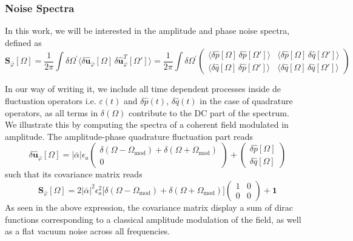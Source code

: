 \subsubsection{Noise Spectra}
In this work, we will be interested in the amplitude and phase noise spectra, defined as
\begin{equation}
  \mathbf{S}_{\bar{\varphi}}[\Omega] =   \frac{1}{2\pi} \int \delta \Omega^{'} \langle \delta \mathbf{\hat{u}}_{\bar{\varphi}}[\Omega]\, \delta \mathbf{\hat{u}}_{\bar{\varphi}}^{T}[\Omega'] \rangle =  \frac{1}{2\pi} \int \delta \Omega^{'} \begin{pmatrix}
  \langle \delta \hat{p}[\Omega]\,\delta \hat{p}[\Omega'] \rangle & \langle \delta \hat{p}[\Omega]\,\delta \hat{q}[\Omega'] \rangle \\[4pt]
  \langle \delta \hat{q}[\Omega]\,\delta \hat{p}[\Omega'] \rangle & \langle \delta \hat{q}[\Omega]\,\delta \hat{q}[\Omega'] \rangle
  \end{pmatrix}
\label{eq:Sa}
\end{equation}

In our way of writing it, we include all time dependent processes inside de fluctuation operators i.e. $\varepsilon(t)$ and $\delta \hat{p}(t)$, $\delta \hat{q}(t)$ in the case of quadrature operators, as all terms in $\delta (\Omega)$ contribute to the DC part of the spectrum. \\

We illustrate this by computing the spectra of a coherent field modulated in amplitude. The amplitude-phase quadrature fluctuation part reads
\begin{equation}
  \delta \mathbf{\hat{\mathbf u}}_{\bar{\varphi}}[\Omega] = |\bar{\alpha}|\epsilon_a \begin{pmatrix}
  \delta(\Omega - \Omega_{\text{mod}}) +\delta(\Omega + \Omega_{\text{mod}}) \\
  0 
\end{pmatrix}
+ \begin{pmatrix}
  \delta \hat{p}[\Omega] \\
  \delta \hat{q}[\Omega]
\end{pmatrix}
\end{equation}
such that its covariance matrix reads 
\begin{equation}
\mathbf{S}_{\bar{\varphi}}[\Omega] =  2|\bar{\alpha}|^{2}\epsilon_a^{2}
\Big[ \delta(\Omega - \Omega_{\mathrm{mod}})
     + \delta(\Omega + \Omega_{\mathrm{mod}}) \Big] \begin{pmatrix}
  1 & 0 \\
  0 & 0
     \end{pmatrix} + \mathbf{1}
\end{equation}
As seen in the above expression, the covariance matrix display a sum of dirac functions corresponding to a classical amplitude modulation of the field, as well as a flat vacuum noise across all frequencies.
